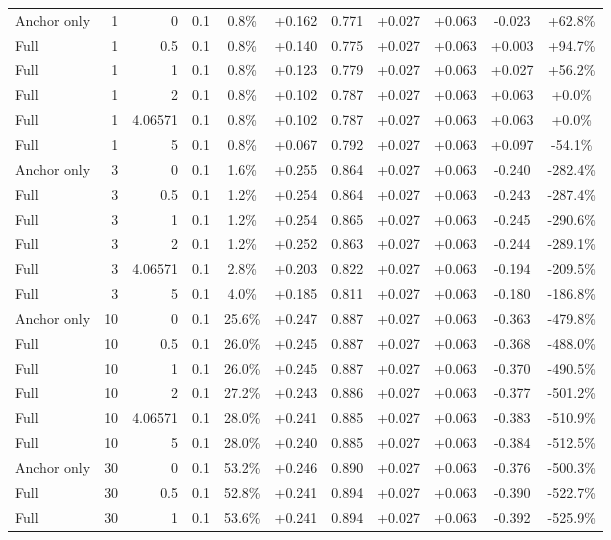 \begin{table}[htbp]
\begin{tabular}{lrrrccccccc}
Anchor only & 1 & 0 & 0.1 & 0.8\% & +0.162 & 0.771 & +0.027 & +0.063 & -0.023 & +62.8\% \\
Full & 1 & 0.5 & 0.1 & 0.8\% & +0.140 & 0.775 & +0.027 & +0.063 & +0.003 & +94.7\% \\
Full & 1 & 1 & 0.1 & 0.8\% & +0.123 & 0.779 & +0.027 & +0.063 & +0.027 & +56.2\% \\
Full & 1 & 2 & 0.1 & 0.8\% & +0.102 & 0.787 & +0.027 & +0.063 & +0.063 & +0.0\% \\
Full & 1 & 4.06571 & 0.1 & 0.8\% & +0.102 & 0.787 & +0.027 & +0.063 & +0.063 & +0.0\% \\
Full & 1 & 5 & 0.1 & 0.8\% & +0.067 & 0.792 & +0.027 & +0.063 & +0.097 & -54.1\% \\
Anchor only & 3 & 0 & 0.1 & 1.6\% & +0.255 & 0.864 & +0.027 & +0.063 & -0.240 & -282.4\% \\
Full & 3 & 0.5 & 0.1 & 1.2\% & +0.254 & 0.864 & +0.027 & +0.063 & -0.243 & -287.4\% \\
Full & 3 & 1 & 0.1 & 1.2\% & +0.254 & 0.865 & +0.027 & +0.063 & -0.245 & -290.6\% \\
Full & 3 & 2 & 0.1 & 1.2\% & +0.252 & 0.863 & +0.027 & +0.063 & -0.244 & -289.1\% \\
Full & 3 & 4.06571 & 0.1 & 2.8\% & +0.203 & 0.822 & +0.027 & +0.063 & -0.194 & -209.5\% \\
Full & 3 & 5 & 0.1 & 4.0\% & +0.185 & 0.811 & +0.027 & +0.063 & -0.180 & -186.8\% \\
Anchor only & 10 & 0 & 0.1 & 25.6\% & +0.247 & 0.887 & +0.027 & +0.063 & -0.363 & -479.8\% \\
Full & 10 & 0.5 & 0.1 & 26.0\% & +0.245 & 0.887 & +0.027 & +0.063 & -0.368 & -488.0\% \\
Full & 10 & 1 & 0.1 & 26.0\% & +0.245 & 0.887 & +0.027 & +0.063 & -0.370 & -490.5\% \\
Full & 10 & 2 & 0.1 & 27.2\% & +0.243 & 0.886 & +0.027 & +0.063 & -0.377 & -501.2\% \\
Full & 10 & 4.06571 & 0.1 & 28.0\% & +0.241 & 0.885 & +0.027 & +0.063 & -0.383 & -510.9\% \\
Full & 10 & 5 & 0.1 & 28.0\% & +0.240 & 0.885 & +0.027 & +0.063 & -0.384 & -512.5\% \\
Anchor only & 30 & 0 & 0.1 & 53.2\% & +0.246 & 0.890 & +0.027 & +0.063 & -0.376 & -500.3\% \\
Full & 30 & 0.5 & 0.1 & 52.8\% & +0.241 & 0.894 & +0.027 & +0.063 & -0.390 & -522.7\% \\
Full & 30 & 1 & 0.1 & 53.6\% & +0.241 & 0.894 & +0.027 & +0.063 & -0.392 & -525.9\% \\

\end{tabular}
\end{table}
